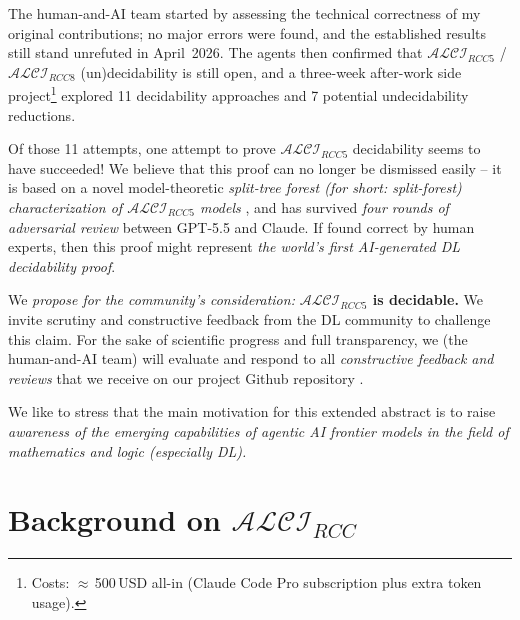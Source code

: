 \documentclass[
]{ceurart}
\theoremstyle{definition}
\newcommand{\ALCIRCC}[1]{\ensuremath{\mathcal{ALCI}_{\mathit{RCC#1}}}}
\begin{document}
\noindent The human-and-AI team started by assessing the technical
correctness of my original contributions; no major errors were found,
and the established results still stand unrefuted in April~2026.  The
agents then confirmed that $\ALCIRCC{5}$ / $\ALCIRCC{8}$
(un)decidability is still open, and a three-week after-work side
project\footnote{Costs: $\approx$\,500\,USD all-in (Claude Code Pro
subscription plus extra token usage).} explored 11 decidability
approaches and 7 potential undecidability reductions.

Of those 11 attempts, one attempt to prove \ALCIRCC{5} decidability
seems to have succeeded! We believe that this proof can no longer be
dismissed easily -- it is based on a novel model-theoretic
\emph{split-tree forest (for short: split-forest) characterization of
\ALCIRCC{5} models} \cite{SiblingCompleted, GPT55Repaired}, and has
survived \emph{four rounds of adversarial review} between GPT-5.5 and
Claude. If found correct by human experts, then this proof might
represent \emph{the world's first AI-generated DL decidability proof}.

We \emph{propose for the community's consideration:} \textbf{$\ALCIRCC{5}$
is decidable.}  We invite scrutiny and constructive feedback from the
DL community to challenge this claim. For the sake of scientific
progress and full transparency, we (the human-and-AI team) will
evaluate and respond to all \emph{constructive feedback and reviews}
that we receive on our project Github repository \cite{ALCIRCC5Repo}.

We like to stress that the main motivation for this extended abstract
is to raise \emph{awareness of the emerging capabilities of agentic AI
frontier models in the field of mathematics and logic (especially DL).}

\section{Background on $\ALCIRCC{}$}
\label{sec:ea-background}
\end{document}

